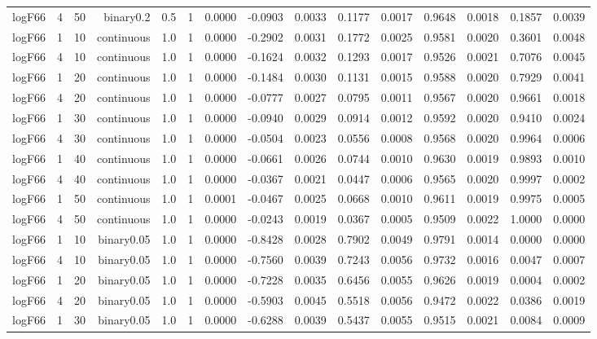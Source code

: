 \begin{longtable}{rrrrrrrrrrrrrrr}
  logF66 & 4 & 50 & binary0.2 & 0.5 & 1 & 0.0000 & -0.0903 & 0.0033 & 0.1177 & 0.0017 & 0.9648 & 0.0018 & 0.1857 & 0.0039 \\ 
  logF66 & 1 & 10 & continuous & 1.0 & 1 & 0.0000 & -0.2902 & 0.0031 & 0.1772 & 0.0025 & 0.9581 & 0.0020 & 0.3601 & 0.0048 \\ 
  logF66 & 4 & 10 & continuous & 1.0 & 1 & 0.0000 & -0.1624 & 0.0032 & 0.1293 & 0.0017 & 0.9526 & 0.0021 & 0.7076 & 0.0045 \\ 
  logF66 & 1 & 20 & continuous & 1.0 & 1 & 0.0000 & -0.1484 & 0.0030 & 0.1131 & 0.0015 & 0.9588 & 0.0020 & 0.7929 & 0.0041 \\ 
  logF66 & 4 & 20 & continuous & 1.0 & 1 & 0.0000 & -0.0777 & 0.0027 & 0.0795 & 0.0011 & 0.9567 & 0.0020 & 0.9661 & 0.0018 \\ 
  logF66 & 1 & 30 & continuous & 1.0 & 1 & 0.0000 & -0.0940 & 0.0029 & 0.0914 & 0.0012 & 0.9592 & 0.0020 & 0.9410 & 0.0024 \\ 
  logF66 & 4 & 30 & continuous & 1.0 & 1 & 0.0000 & -0.0504 & 0.0023 & 0.0556 & 0.0008 & 0.9568 & 0.0020 & 0.9964 & 0.0006 \\ 
  logF66 & 1 & 40 & continuous & 1.0 & 1 & 0.0000 & -0.0661 & 0.0026 & 0.0744 & 0.0010 & 0.9630 & 0.0019 & 0.9893 & 0.0010 \\ 
  logF66 & 4 & 40 & continuous & 1.0 & 1 & 0.0000 & -0.0367 & 0.0021 & 0.0447 & 0.0006 & 0.9565 & 0.0020 & 0.9997 & 0.0002 \\ 
  logF66 & 1 & 50 & continuous & 1.0 & 1 & 0.0001 & -0.0467 & 0.0025 & 0.0668 & 0.0010 & 0.9611 & 0.0019 & 0.9975 & 0.0005 \\ 
  logF66 & 4 & 50 & continuous & 1.0 & 1 & 0.0000 & -0.0243 & 0.0019 & 0.0367 & 0.0005 & 0.9509 & 0.0022 & 1.0000 & 0.0000 \\ 
  logF66 & 1 & 10 & binary0.05 & 1.0 & 1 & 0.0000 & -0.8428 & 0.0028 & 0.7902 & 0.0049 & 0.9791 & 0.0014 & 0.0000 & 0.0000 \\ 
  logF66 & 4 & 10 & binary0.05 & 1.0 & 1 & 0.0000 & -0.7560 & 0.0039 & 0.7243 & 0.0056 & 0.9732 & 0.0016 & 0.0047 & 0.0007 \\ 
  logF66 & 1 & 20 & binary0.05 & 1.0 & 1 & 0.0000 & -0.7228 & 0.0035 & 0.6456 & 0.0055 & 0.9626 & 0.0019 & 0.0004 & 0.0002 \\ 
  logF66 & 4 & 20 & binary0.05 & 1.0 & 1 & 0.0000 & -0.5903 & 0.0045 & 0.5518 & 0.0056 & 0.9472 & 0.0022 & 0.0386 & 0.0019 \\ 
  logF66 & 1 & 30 & binary0.05 & 1.0 & 1 & 0.0000 & -0.6288 & 0.0039 & 0.5437 & 0.0055 & 0.9515 & 0.0021 & 0.0084 & 0.0009 \\ 

\end{longtable}
